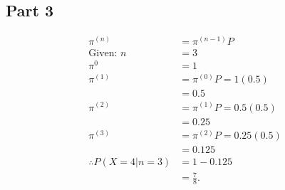 \subsection{Part 3}

\begin{align*}
	\pi^{(n)} &= \pi^{(n-1)}P \\
	\text{Given: } n &= 3 \\
	\pi^{0} &= 1 \\
	\pi^{(1)} &= \pi^{(0)}P  = 1(0.5) \\
		  &= 0.5 \\
	\pi^{(2)} &= \pi^{(1)}P = 0.5(0.5) \\
		&= 0.25 \\
	\pi^{(3)} &= \pi^{(2)}P = 0.25(0.5) \\
		  &= 0.125 \\
	\therefore P(X=4 | n=3 ) &= 1-0.125 \\
				 &= \frac{7}{8}
.\end{align*}
